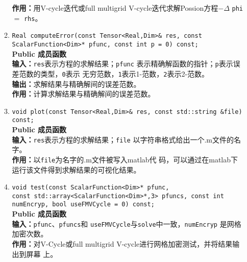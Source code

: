 \documentclass[a4paper,twoside]{ctexart}
\begin{document}
\begin{itemize}
\begin{enumerate}[(1)]
          \textbf{作用：}用V-cycle迭代或full
          multigrid V-cycle迭代求解Possion方程$-\Delta$ \texttt{phi} $=$
          \texttt{rhs}。
          \item \texttt{Real computeError(const Tensor<Real,Dim>\& res, const ScalarFunction<Dim>* pfunc,
                    const int p = 0) const;}\\
          \textbf{Public 成员函数}\\
          \textbf{输入：}\texttt{res}表示方程的求解结果；\texttt{pfunc}
          表示精确解函数的指针；\texttt{p}表示误差范数的类型，\texttt{0}表示
          无穷范数，\texttt{1}表示1-范数，\texttt{2}表示2-范数。\\
          \textbf{输出：}求解结果与精确解间的误差范数。\\
          \textbf{作用：}计算求解结果与精确解间的误差范数。
          \item \texttt{void plot(const Tensor<Real,Dim>\& res, const
              std::string \&file) const;}\\
          \textbf{Public 成员函数}\\
          \textbf{输入：}\texttt{res}表示方程的求解结果；\texttt{file}
          以字符串格式给出一个$.$m文件的名字。\\
          \textbf{作用：}以\texttt{file}为名字的$.$m文件被写入matlab代
          码，可以通过在matlab下运行该文件得到求解结果的可视化结果。
          \item \texttt{void test(const ScalarFunction<Dim>* pfunc,\\
            const std::array<ScalarFunction<Dim>*,3> pfuncs, const int
            numEncryp, bool useFMVCycle = 0) const;}\\
          \textbf{Public 成员函数}\\
          \textbf{输入：}\texttt{pfunc}、\texttt{pfuncs}和
          \texttt{useFMVCycle}与\texttt{solve}中一致，\texttt{numEncryp} 是网格加密次数。\\
          \textbf{作用：}对V-Cycle或full multigrid V-cycle进行网格加密测试，并将结果输出到屏幕
          上。
         
            \end{enumerate}
          \end{itemize}
          \newpage
\end{document}

